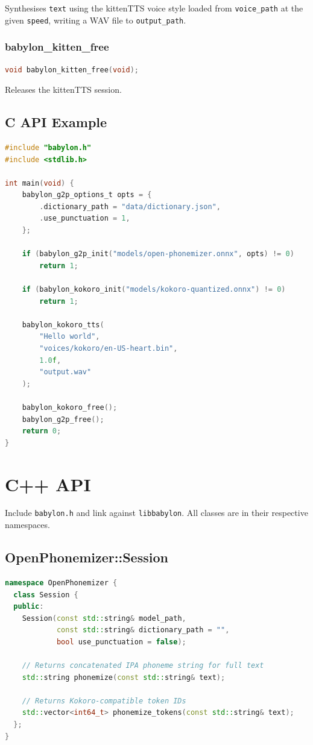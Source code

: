 \documentclass[12pt,a4paper]{article}
\begin{document}
Synthesises \texttt{text} using the kittenTTS voice style loaded from \texttt{voice\_path} at the given \texttt{speed}, writing a WAV file to \texttt{output\_path}.

\subsubsection{babylon\_kitten\_free}

\begin{lstlisting}[language=c]
void babylon_kitten_free(void);
\end{lstlisting}

Releases the kittenTTS session.

\subsection{C API Example}

\begin{lstlisting}[language=c]
#include "babylon.h"
#include <stdlib.h>

int main(void) {
    babylon_g2p_options_t opts = {
        .dictionary_path = "data/dictionary.json",
        .use_punctuation = 1,
    };

    if (babylon_g2p_init("models/open-phonemizer.onnx", opts) != 0)
        return 1;

    if (babylon_kokoro_init("models/kokoro-quantized.onnx") != 0)
        return 1;

    babylon_kokoro_tts(
        "Hello world",
        "voices/kokoro/en-US-heart.bin",
        1.0f,
        "output.wav"
    );

    babylon_kokoro_free();
    babylon_g2p_free();
    return 0;
}
\end{lstlisting}

\section{C++ API}
\label{sec:cpp-api}

Include \texttt{babylon.h} and link against \texttt{libbabylon}. All classes are in their respective namespaces.

\subsection{OpenPhonemizer::Session}

\begin{lstlisting}[language=c++]
namespace OpenPhonemizer {
  class Session {
  public:
    Session(const std::string& model_path,
            const std::string& dictionary_path = "",
            bool use_punctuation = false);

    // Returns concatenated IPA phoneme string for full text
    std::string phonemize(const std::string& text);

    // Returns Kokoro-compatible token IDs
    std::vector<int64_t> phonemize_tokens(const std::string& text);
  };
}
\end{lstlisting}
\end{document}
